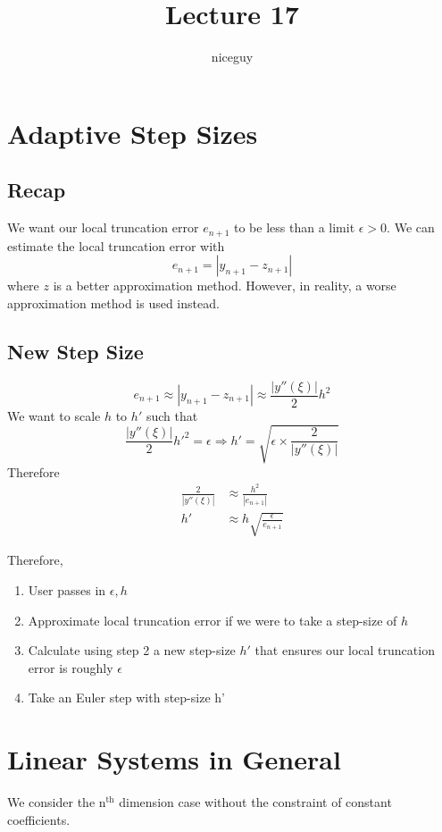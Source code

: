 \documentclass[12pt]{article}
\author{niceguy}
\title{Lecture 17}
\begin{document}
\maketitle

\section{Adaptive Step Sizes}

\subsection{Recap}
We want our local truncation error $e_{n+1}$ to be less than a limit $\epsilon > 0$. We can estimate the local truncation error with
$$e_{n+1} = |y_{n+1} - z_{n+1}|$$
where $z$ is a better approximation method. However, in reality, a worse approximation method is used instead.

\subsection{New Step Size}
$$e_{n+1} \approx |y_{n+1} - z_{n+1}| \approx \frac{|y''(\xi)|}{2}h^2$$
We want to scale $h$ to $h'$ such that
$$\frac{|y''(\xi)|}{2}h'^2 = \epsilon \Rightarrow h' = \sqrt{\epsilon \times \frac{2}{|y''(\xi)|}}$$
Therefore
\begin{align*}
	\frac{2}{|y''(\xi)|} &\approx \frac{h^2}{|e_{n+1}|} \\
	h' &\approx h\sqrt{\frac{\epsilon}{e_{n+1}}}
\end{align*}

Therefore,
\begin{enumerate}
	\item User passes in $\epsilon, h$
	\item Approximate local truncation error if we were to take a step-size of $h$
	\item Calculate using step 2 a new step-size $h'$ that ensures our local truncation error is roughly $\epsilon$
	\item Take an Euler step with step-size h'
\end{enumerate}

\section{Linear Systems in General}

We consider the n$^{\text{th}}$ dimension case without the constraint of constant coefficients.
\end{document}
